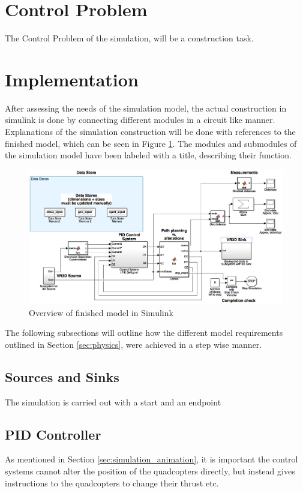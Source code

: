 \section{Control Problem}
\label{sec:control_problem}
The Control Problem of the simulation, will be a construction task. 

\section{Implementation}
\label{sec:construction}

After assessing the needs of the simulation model, the actual construction in simulink is done by connecting different modules in a circuit like manner. Explanations of the simulation construction will be done with references to the finished model, which can be seen in Figure \ref{fig:model_overview}. The modules and submodules of the simulation model have been labeled with a title, describing their function. 

\begin{figure}[h!]
  \centering
  \includegraphics[width=1\columnwidth]{figures/model_overview}
  \caption{\label{fig:model_overview}Overview of finished model in Simulink}
\end{figure}

The following subsections will outline how the different model requirements outlined in Section \ref{sec:physics}, were achieved in a step wise manner.

\subsection{Sources and Sinks}
The simulation is carried out with a start and an endpoint 

\subsection{PID Controller}
As mentioned in Section \ref{sec:simulation_animation}, it is important the control systems cannot alter the position of the quadcopters directly, but instead gives instructions to the quadcopters to change their thrust etc. 

